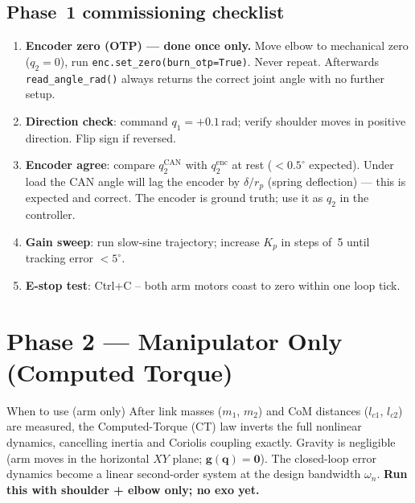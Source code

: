 \documentclass[11pt,a4paper]{article}
\newcommand{\vq}{\bm{q}}
\newcommand{\vg}{\bm{g}}
\begin{document}
\subsection{Phase~1 commissioning checklist}

\begin{enumerate}[leftmargin=2em]
  \item \textbf{Encoder zero (OTP) --- done once only.}  Move elbow to
        mechanical zero ($q_2{=}0$), run
        \texttt{enc.set\_zero(burn\_otp=True)}.  Never repeat.
        Afterwards \texttt{read\_angle\_rad()} always returns the correct
        joint angle with no further setup.
  \item \textbf{Direction check}: command $q_1{=}+0.1$\,rad; verify shoulder
        moves in positive direction.  Flip sign if reversed.
  \item \textbf{Encoder agree}: compare $q_2^{\mathrm{CAN}}$ with
        $q_2^{\mathrm{enc}}$ at rest ($<0.5^\circ$ expected).
        Under load the CAN angle will lag the encoder by
        $\delta/r_p$ (spring deflection) --- this is expected and correct.
        The encoder is ground truth; use it as $q_2$ in the controller.
  \item \textbf{Gain sweep}: run slow-sine trajectory; increase $K_p$ in
        steps of~5 until tracking error $<5^\circ$.
  \item \textbf{E-stop test}: Ctrl+C -- both arm motors coast to zero
        within one loop tick.
\end{enumerate}

\section{Phase 2 --- Manipulator Only (Computed Torque)}
\label{sec:phase2}

\begin{phase2box}{When to use (arm only)}
After link masses ($m_1$, $m_2$) and CoM distances ($l_{c1}$, $l_{c2}$)
are measured, the Computed-Torque (CT) law inverts the full nonlinear
dynamics, cancelling inertia and Coriolis coupling exactly.
Gravity is negligible (arm moves in the horizontal $XY$ plane; $\vg(\vq)=\mathbf{0}$).
The closed-loop error dynamics become a linear second-order system
at the design bandwidth $\omega_n$.
\textbf{Run this with shoulder + elbow only; no exo yet.}
\end{phase2box}
\end{document}
